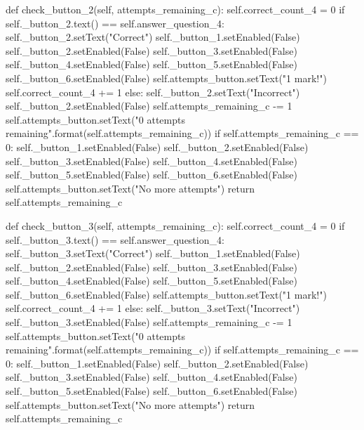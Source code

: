 \begin{landscape}
\begin{python}
    def check_button_2(self, attempts_remaining_c):
        self.correct_count_4 = 0
        if self._button_2.text() == self.answer_question_4:
            self._button_2.setText("Correct")
            self._button_1.setEnabled(False)
            self._button_2.setEnabled(False)
            self._button_3.setEnabled(False)
            self._button_4.setEnabled(False)
            self._button_5.setEnabled(False)
            self._button_6.setEnabled(False)
            self.attempts_button.setText("1 mark!")
            self.correct_count_4 += 1
        else:
            self._button_2.setText("Incorrect")
            self._button_2.setEnabled(False)
            self.attempts_remaining_c -= 1
            self.attempts_button.setText("{0} attempts remaining".format(self.attempts_remaining_c))
            if self.attempts_remaining_c == 0:
                self._button_1.setEnabled(False)
                self._button_2.setEnabled(False)
                self._button_3.setEnabled(False)
                self._button_4.setEnabled(False)
                self._button_5.setEnabled(False)
                self._button_6.setEnabled(False)
                self.attempts_button.setText("No more attempts")
            return self.attempts_remaining_c
                
    def check_button_3(self, attempts_remaining_c):
        self.correct_count_4 = 0
        if self._button_3.text() == self.answer_question_4:
            self._button_3.setText("Correct")
            self._button_1.setEnabled(False)
            self._button_2.setEnabled(False)
            self._button_3.setEnabled(False)
            self._button_4.setEnabled(False)
            self._button_5.setEnabled(False)
            self._button_6.setEnabled(False)
            self.attempts_button.setText("1 mark!")
            self.correct_count_4 += 1
        else:
            self._button_3.setText("Incorrect")
            self._button_3.setEnabled(False)
            self.attempts_remaining_c -= 1
            self.attempts_button.setText("{0} attempts remaining".format(self.attempts_remaining_c))
            if self.attempts_remaining_c == 0:
                self._button_1.setEnabled(False)
                self._button_2.setEnabled(False)
                self._button_3.setEnabled(False)
                self._button_4.setEnabled(False)
                self._button_5.setEnabled(False)
                self._button_6.setEnabled(False)
                self.attempts_button.setText("No more attempts")
            return self.attempts_remaining_c
                

\end{python}
\end{landscape}
